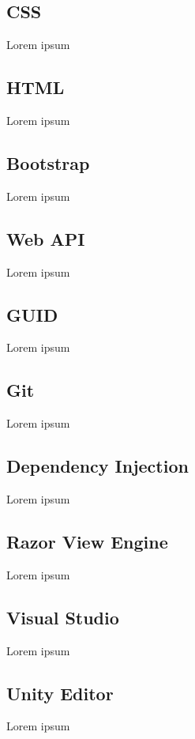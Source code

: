  \subsection*{CSS}
Lorem ipsum
\subsection*{HTML}
Lorem ipsum
\subsection*{Bootstrap}
Lorem ipsum
\subsection*{Web API}
Lorem ipsum
\subsection*{GUID}
Lorem ipsum
\subsection*{Git}
Lorem ipsum
\subsection*{Dependency Injection}
Lorem ipsum
\subsection*{Razor View Engine}
Lorem ipsum
\subsection*{Visual Studio}
Lorem ipsum
\subsection*{Unity Editor}
Lorem ipsum

